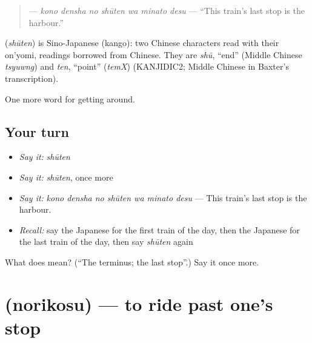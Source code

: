 \begin{quote}
\textbf{   } — \emph{kono densha no shūten wa minato desu} — \textquotedblleft{}This train's last stop is the harbour.\textquotedblright{}
\end{quote}

\begin{cousinweb}
\textbf{} (\emph{shūten}) is Sino-Japanese (kango): two Chinese characters read with their on'yomi, readings borrowed from Chinese. They are \emph{shū}, \textquotedblleft{}end\textquotedblright{} (Middle Chinese \emph{tsyuwng}) and \emph{ten}, \textquotedblleft{}point\textquotedblright{} (\emph{temX}) (KANJIDIC2; Middle Chinese in Baxter's transcription).
\end{cousinweb}

\begin{grammarlens}[title={What you've built}]
One more word for getting around.
\end{grammarlens}

\subsection*{Your turn}
\begin{itemize}
\raggedright
  \item \emph{Say it:} \emph{shūten}
  \item \emph{Say it:} \emph{shūten}, once more
  \item \emph{Say it:} \emph{kono densha no shūten wa minato desu} — This train's last stop is the harbour.
  \item \emph{Recall:} say the Japanese for the first train of the day, then the Japanese for the last train of the day, then say \emph{shūten} again
\end{itemize}

\begin{tcolorbox}[breakable,colback=teal!4,colframe=teal!35!black,title={Before you move on}]
What does  mean? (\textquotedblleft{}The terminus; the last stop\textquotedblright{}.) Say it once more.
\end{tcolorbox}
\section[\texorpdfstring{\ja{のりこす} (norikosu)}{のりこす (norikosu)}]{ (norikosu) — to ride past one's stop}

\label{lesson:JA-C375-norikosu}




